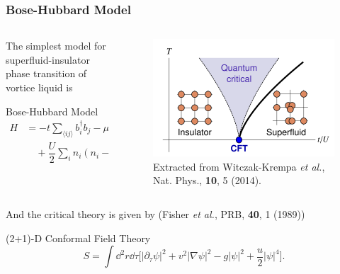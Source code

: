 \documentclass[10pt,aspectratio=43,xcolor=x11names,t]{beamer}%
\begin{document}
		\begin{frame}\frametitle{Bose-Hubbard Model}
			\begin{columns}
				\begin{column}{0.45\textwidth}
					The simplest model for superfluid-insulator phase transition of vortice liquid is
					\begin{block}{Bose-Hubbard Model}
						\begin{align*}
							H&=-t\sum_{\langle ij \rangle}b_i^\dagger b_j-\mu\sum_i n_i\\
							&\quad+\dfrac{U}{2}\sum_i n_i(n_i-1)
						\end{align*}
					\end{block}
				\end{column}
				\begin{column}{0.5\textwidth}
					\begin{figure}[!htp]
						\includegraphics[scale=0.5]{Witczak.png}
						\caption{Extracted from {\scriptsize Witczak-Krempa \textit{et al.}, Nat. Phys., \textbf{10}, 5 (2014)}.}
					\end{figure}
				\end{column}
			\end{columns}
			\pause
			And the critical theory is given by ({\scriptsize Fisher \textit{et al.}, PRB, \textbf{40}, 1 (1989)})
			\begin{redblock}{(2+1)-D Conformal Field Theory}
				\begin{equation*}
					S=\int\dd^2r\dd\tau\bigg[|\partial_\tau\psi|^2+v^2|\nabla\psi|^2-g|\psi|^2+\dfrac{u}{2}|\psi|^4\bigg].
				\end{equation*}
			\end{redblock}
		\end{frame}
\end{document}
